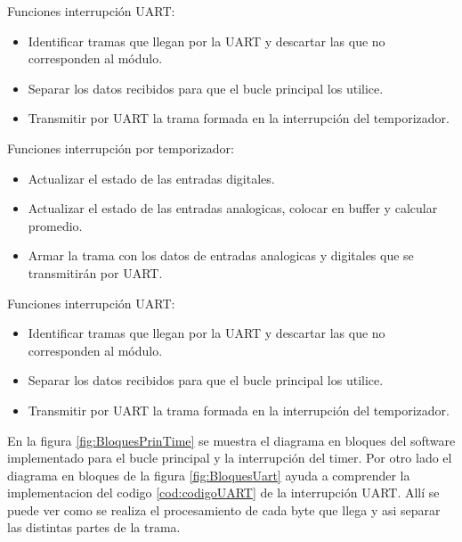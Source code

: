Funciones interrupción UART:
\begin{itemize}
	\item Identificar tramas que llegan por la UART y descartar las que no corresponden al módulo.
	\item Separar los datos recibidos para que el bucle principal los utilice.
	\item Transmitir por UART la trama formada en la interrupción del temporizador.
\end{itemize}


Funciones interrupción por temporizador:
\begin{itemize}
	\item Actualizar el estado de las entradas digitales.
	\item Actualizar el estado de las entradas analogicas, colocar en buffer y calcular promedio.
	\item Armar la trama con los datos de entradas analogicas y digitales que se transmitirán por UART.
\end{itemize}

Funciones interrupción UART:
\begin{itemize}
	\item Identificar tramas que llegan por la UART y descartar las que no corresponden al módulo.
	\item Separar los datos recibidos para que el bucle principal los utilice.
	\item Transmitir por UART la trama formada en la interrupción del temporizador.
\end{itemize}

En la figura \ref{fig:BloquesPrinTime} se muestra el diagrama en bloques del software implementado para el bucle principal y la interrupción del timer. Por otro lado el diagrama en bloques de la figura \ref{fig:BloquesUart} ayuda a comprender la implementacion del codigo \ref{cod:codigoUART} de la interrupción UART. Allí se puede ver como se realiza el procesamiento de cada byte que llega y asi separar las distintas partes de la trama.



